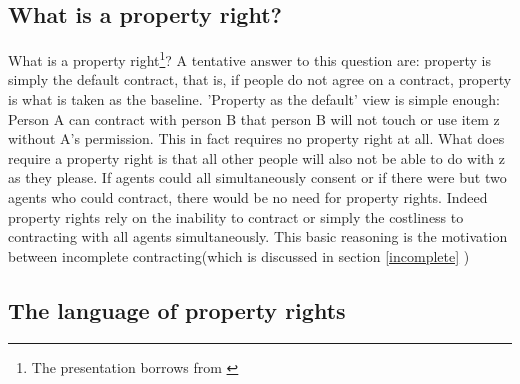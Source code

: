 \documentclass[12pt]{report}
\numberwithin{equation}{section}
\begin{document}


\newpage


\subsection{What is a property right?}

What is a property right\footnote{The presentation borrows from \cite{Munzer1990}}? 
A tentative answer to this question are: property is simply the default contract, that is, if people do not agree on a contract, property is what is taken as the baseline. 'Property as the default' view is simple enough: Person A can contract with person B that person B will not touch or use item z without A's permission. This in fact requires no property right at all. What does require a property right is that all other people will also not be able to do with z as they please. If agents could all simultaneously consent or if there were but two agents who could contract, there would be no need for property rights. Indeed property rights rely on the inability to contract or simply the costliness to contracting with all agents simultaneously. This basic reasoning is the motivation between incomplete contracting(which is discussed in section \ref{incomplete} )


\subsection{The language of property rights}
\end{document}
